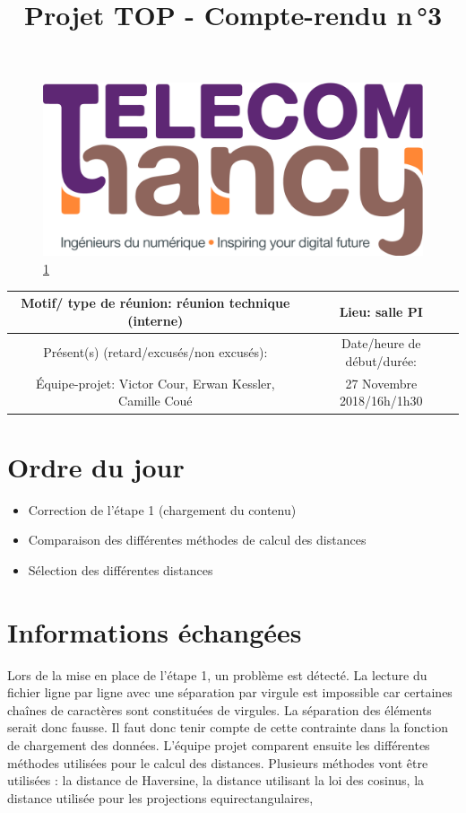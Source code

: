 \documentclass{article}
\date{}
\begin{document}
\begin{figure}
    \centering
    \includegraphics[scale=0.05]{logo_TNCY.png}
    \label{fig:logo_tncy}
    \ref{fig:logo_tncy}
\end{figure}
\title{Projet TOP - Compte-rendu n\,°3}
\maketitle
\vspace*{-1cm}

\begin{tabular}{|c|c|}
  \hline
  Motif/ type de réunion: réunion technique (interne) & Lieu: salle PI \\
  \hline
   Présent(s) (retard/excusés/non excusés): &  Date/heure de début/durée:\\
  Équipe-projet: Victor Cour,
                  Erwan Kessler,
                  Camille Coué
 & 27 Novembre 2018/16h/1h30 \\
  \hline
\end{tabular}


\section{Ordre du jour}
\begin{itemize}
  \item Correction de l'étape 1 (chargement du contenu)
  \item Comparaison des différentes méthodes de calcul des distances 
  \item Sélection des différentes distances
\end{itemize}

\section{Informations échangées}
Lors de la mise en place de l'étape 1, un problème est détecté. La lecture du fichier ligne par ligne avec une séparation par virgule est impossible car certaines chaînes de caractères sont constituées de virgules. La séparation des éléments serait donc fausse. Il faut donc tenir compte de cette contrainte dans la fonction de chargement des données.
\newline
L'équipe projet comparent ensuite les différentes méthodes utilisées pour le calcul des distances.
Plusieurs méthodes vont être utilisées : la distance de Haversine, la distance utilisant la loi des cosinus, la distance utilisée pour les projections equirectangulaires, 
\end{document}
